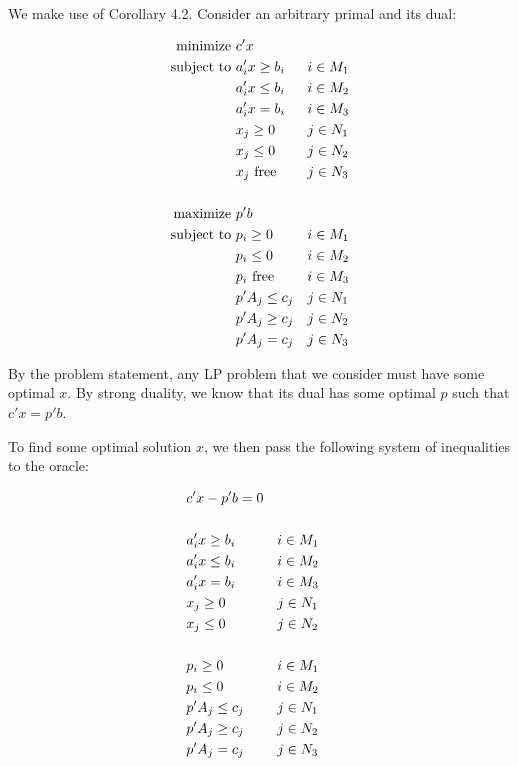 We make use of Corollary 4.2. Consider an arbitrary primal and its dual:

\begin{align}
    \text{minimize } &c'x &&\notag\\
    \text{subject to } &a_i'x\geq b_i &&  i\in M_1 \notag\\
                    &a_i'x\leq b_i &&  i \in M_2 \notag\\
                    &a_i'x= b_i &&  i \in M_3 \notag\\
                    &x_j\geq 0 && j \in N_1 \notag\\
                    &x_j\leq 0 && j \in N_2 \notag\\
                    &x_j\text{ free} && j \in N_3 \notag\\\\  
    \text{maximize } &p'b\notag&&\\
    \text{subject to } &p_i\geq 0 &&  i\in M_1 \notag\\
                    &p_i\leq 0 &&  i \in M_2 \notag\\
                    &p_i\text{ free} &&  i \in M_3 \notag\\
                    &p'A_j\leq c_j && j \in N_1 \notag\\
                    &p'A_j\geq c_j && j \in N_2 \notag\\
                    &p'A_j=c_j && j \in N_3 \notag
\end{align}

By the problem statement, any LP problem that we consider must have some optimal $x$. By strong duality, we know that its dual has some optimal $p$ such that $c'x=p'b$.

To find some optimal solution $x$, we then pass the following system of inequalities to the oracle:

\begin{align}
					&c'x-p'b=0\notag\\\\
                    &a_i'x\geq b_i &&  i\in M_1 \notag\\
                    &a_i'x\leq b_i &&  i \in M_2 \notag\\
                    &a_i'x= b_i &&  i \in M_3 \notag\\
                    &x_j\geq 0 && j \in N_1 \notag\\
                    &x_j\leq 0 && j \in N_2 \notag\\\\
                    &p_i\geq 0 &&  i\in M_1 \notag\\
                    &p_i\leq 0 &&  i \in M_2 \notag\\
                    &p'A_j\leq c_j && j \in N_1 \notag\\
                    &p'A_j\geq c_j && j \in N_2 \notag\\
                    &p'A_j=c_j && j \in N_3 \notag
\end{align}

